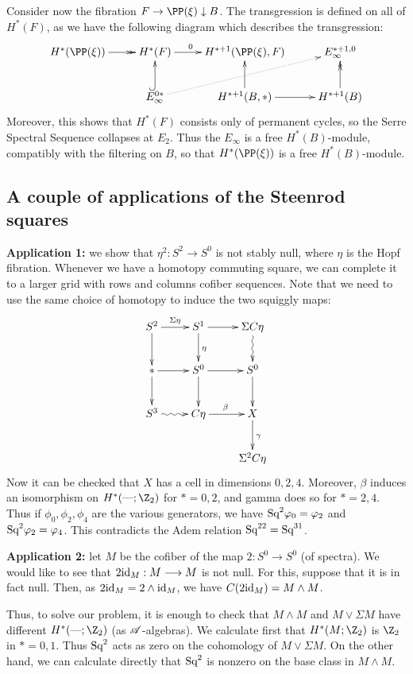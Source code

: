 \documentclass[11pt]{article}
\newcommand{\myheading}[1]
{{\noindent\Large #1}

}
\renewcommand{\myheading}[1]{\subsection{#1}}
\begin{document}
Consider now the fibration $F \rightarrow\PP(\xi)\downarrow B$. The transgression is defined on all of $H^*(F)$, as we have the following diagram which describes the transgression:
\[\xymatrix{
H^*(\PP(\xi))\ar@{->>}[r]&H^*(F)\ar[r]^{0\ \ \ \ \ }&H^{*+1}(\PP(\xi),F)&E_\infty^{*+1,0}\\
&E_\infty^{0*}\ar@{^{(}->}[u]\ar@{.>}[rur]&H^{*+1}(B,*)\ar[u]\ar[r]&H^{*+1}(B)\ar@{->>}[u]
}\]
Moreover, this shows that $H^*(F)$ consists only of permanent cycles, so the Serre Spectral Sequence collapses at $E_2$. Thus the $E_\infty$ is a free $H^*(B)$-module, compatibly with the filtering on $B$, so that $H^*(\PP(\xi))$ is a free $H^*(B)$-module.




\myheading{A couple of applications of the Steenrod squares}
\textbf{Application 1:} we show that $\eta^2:S^2\to S^0$ is not stably null,
where $\eta$ is the Hopf fibration. Whenever we have a homotopy commuting
square, we can complete it to a larger grid with rows and columns cofiber
sequences. Note that we need to use the same choice of homotopy to induce the
two squiggly maps:
\[\xymatrix{
S^2\ar[r]^{\Sigma\eta}\ar[d]&S^1\ar[r]\ar[d]^\eta&\Sigma C\eta\ar@{~>}[d]\\
\text{$*$}\ar[r]\ar[d]&S^0\ar[r]\ar[d]&S^0\ar[d]\\
S^3\ar@{~>}[r]&C\eta\ar[r]^\beta&X\ar[d]^\gamma\\
&&\Sigma^2C\eta
}\]
Now it can be checked that $X$ has a cell in dimensions $0,2,4$. Moreover,
$\beta$ induces an isomorphism on $H^*(\DASH;\Z_2)$ for $*=0,2$, and gamma does
so for $*=2,4$. Thus if $\phi_0,\phi_2,\phi_4$ are the various generators, we
have $\textup{Sq}^2\varphi_0=\varphi_2$ and $\textup{Sq}^2\varphi_2=\varphi_4$. This contradicts the Adem
relation $\textup{Sq}^{22}=\textup{Sq}^{31}$.

\textbf{Application 2:}  let $M$ be the cofiber of the map $2:S^0\to S^0$ (of
spectra). We would like to see that $2\textup{id}_M:M\longrightarrow M$ is not null. For this,
suppose that it is in fact null. Then, as $2\textup{id}_M=2\wedge\textup{id}_M$, we have
$C(2\textup{id}_M)=M\wedge M$.

Thus, to solve our problem, it is enough to check that $M\wedge M$ and $M\vee
\Sigma M$ have different $H^*(\DASH;\Z_2)$ (as $\mathscr{A}$-algebras). We calculate
first that $H^*(M;\Z_2)$ is $\Z_2$ in $*=0,1$. Thus $\textup{Sq}^2$ acts as zero on the
cohomology of $M\vee \Sigma M$. On the other hand, we can calculate directly
that $\textup{Sq}^2$ is nonzero on the base class in $M\wedge M$.
\end{document}
